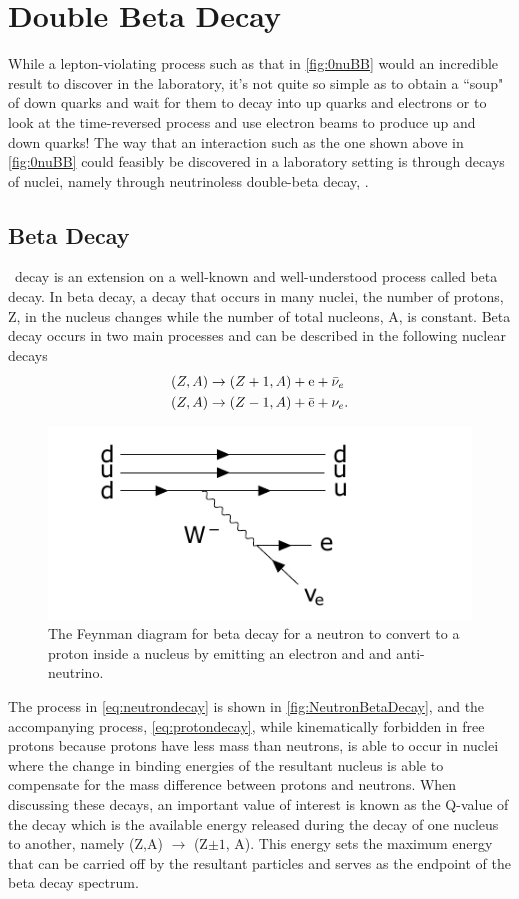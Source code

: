 \chapter{Double Beta Decay}
\label{chap:Beta Decay}

While a lepton-violating process such as that in \autoref{fig:0nuBB} would an incredible result to discover in the laboratory, it's not quite so simple as to obtain a ``soup" of down quarks and wait for them to decay into up quarks and electrons or to look at the time-reversed process and use electron beams to produce up and down quarks!
The way that an interaction such as the one shown above in \autoref{fig:0nuBB} could feasibly be discovered in a laboratory setting is through decays of nuclei, namely through neutrinoless double-beta decay, \zeronubb. 
\section{Beta Decay}
\label{sec:Beta Decay}
\zeronubb~decay is an extension on a well-known and well-understood process called beta decay. In beta decay, a decay that occurs in many nuclei, the number of protons, Z, in the nucleus changes while the number of total nucleons, A, is constant.
Beta decay occurs in two main processes and can be described in the following nuclear decays
\begin{align}
    (Z, A) & \rightarrow (Z+1, A)+\textrm{e}+\Bar{\nu}_e \label{eq:neutrondecay} \\
    (Z, A) & \rightarrow (Z-1, A)+\Bar{\textrm{e}}+\nu_e. \label{eq:protondecay}
\end{align}
\begin{figure}[tbph]
    \centering
    \includegraphics[width=0.8\linewidth]{Figures/NeutronBetaDecay.pdf}
    \caption[Beta Decay Feynman diagram for a neutron converting to a proton]
    {The Feynman diagram for beta decay for a neutron to convert to a proton inside a nucleus by emitting an electron and and anti-neutrino.}
    \label{fig:NeutronBetaDecay}
\end{figure}
The process in \autoref{eq:neutrondecay} is shown in \autoref{fig:NeutronBetaDecay}, and the accompanying process, \autoref{eq:protondecay}, while kinematically forbidden in free protons because protons have less mass than neutrons, is able to occur in nuclei where the change in binding energies of the resultant nucleus is able to compensate for the mass difference between protons and neutrons.
When discussing these decays, an important value of interest is known as the Q-value of the decay which is the available energy released during the decay of one nucleus to another, namely (Z,A) $\rightarrow$ (Z$\pm1$, A).
This energy sets the maximum energy that can be carried off by the resultant particles and serves as the endpoint of the beta decay spectrum. 
